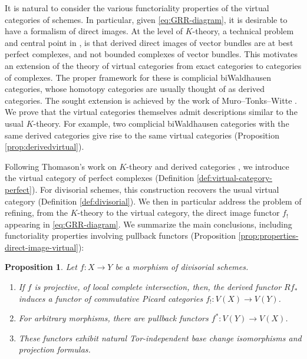 \documentclass[JEP,XML,SOM,Unicode,published]{cedram}
\theoremstyle{plain}
\newtheorem{prop}[thm]{Proposition}
\theoremstyle{definition}
\begin{document}
It is natural to consider the various functoriality properties of the virtual categories of schemes. In particular, given \eqref{eq:GRR-diagram}, it is desirable to have a formalism of direct images. At the level of $K$-theory, a technical problem and central point in \cite{SGA6}, is that derived direct images of vector bundles are at best perfect complexes, and not bounded complexes of vector bundles. This motivates an extension of the theory of virtual categories from exact categories to categories of complexes. The proper framework for these is complicial biWaldhausen categories, whose homotopy categories are usually thought of as derived categories. The sought extension is achieved by the work of Muro--Tonks--Witte \cite{Muro:determinant}. We prove that the virtual categories themselves admit descriptions similar to the usual $K$-theory. For example, two complicial biWaldhausen categories with the same derived categories give rise to the same virtual categories (\cf Proposition \ref{prop:derivedvirtual}).

Following Thomason's work on $K$-theory and derived categories \cite{ThomasonTrobaugh}, we introduce the virtual category of perfect complexes (\cf Definition \ref{def:virtual-category-perfect}). For divisorial schemes, this construction recovers the usual virtual category (\cf Definition \ref{def:divisorial}). We then in particular address the problem of refining, from the $K$-theory to the virtual category, the direct image functor $f_{!}$ appearing in \eqref{eq:GRR-diagram}. We summarize the main conclusions, including functoriality properties involving pullback functors (\cf Proposition \ref{prop:properties-direct-image-virtual}):
\begin{prop}\label{prop:intro-direct}
Let $f\colon X\to Y$ be a morphism of divisorial schemes.

\begin{enumerate}
\item If $f$ is projective, of local complete intersection, then, the derived functor $Rf_{\ast}$ induces a functor of commutative Picard categories $f_{!}\colon V(X)\to V(Y)$.

\item For arbitrary morphisms, there are pullback functors $f^\ast \colon V(Y) \to V(X)$.

\item These functors exhibit natural Tor-independent base change isomorphisms and projection formulas.
\end{enumerate}
\end{prop}
\end{document}
